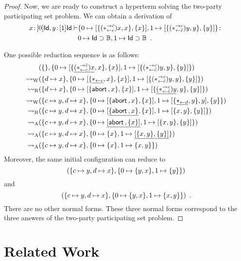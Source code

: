 \begin{proof}
Now, we are ready to construct a hyperterm solving the two-party
participating set problem.
We can obtain a derivation of
 \begin{align*}
{x} \mathord{\colon\kern -2pt}{[0]\mathsf{Id}}, {y} \mathord{\colon\kern -2pt}{[1]\mathsf{Id}}\vdash &
{\{0\mapsto[{\{(\ast^{\rightarrow {\bar{c}}}_{\leftarrow{c}})x,x\},\{x\}}],
1\mapsto[{\{(\ast^{\rightarrow {c}}_{\leftarrow{\bar{c}}})y,y\},\{y\}}]\}}\colon\\
&{0\mapsto \mathsf{Id}\supset \mathbb{B}, 1\mapsto \mathsf{Id}\supset \mathbb{B}}\enspace.
 \end{align*}

One possible reduction sequence is as follows:
\begin{align*}
 &
 ({\{\}},{\{0\mapsto[{\{\underline{(\ast^{\rightarrow {\bar{c}}}_{\leftarrow{c}})x},x\},\{x\}}],
 1\mapsto [{\{(\ast^{\rightarrow {c}}_{\leftarrow{\bar{c}}})y,y\},\{y\}}]\}})\\
 \rightsquigarrow_{\mathrm W}
 &({\{d\mapsto x\}},{\{0\mapsto[{\{\underline{\ast_{\leftarrow{c}}},x\},\{x\}}],
 1\mapsto[{\{(\ast^{\rightarrow {c}}_{\leftarrow{\bar{c}}})y,y\},\{y\}}]\}})
 \\
 \rightsquigarrow_{\mathrm R}
 &
 ({\{d\mapsto x\}},{\{0\mapsto [{\{\mathsf{abort\,},x\},
 \{x\}}],1\mapsto[{\{\underline{(\ast^{\rightarrow {c}}_{\leftarrow{\bar{c}}})y},y\},\{y\}}]\}})
 \\
 \rightsquigarrow_{\mathrm W}
 &
 ({\{c\mapsto y, d\mapsto x\}},{\{0\mapsto [{\{\mathsf{abort\,},x\},\{x\}}], 1\mapsto
 [{\{\underline{\ast_{\leftarrow{d}}},y\},y}],\{y\}\}}) \\
 \rightsquigarrow_{\mathrm R}
 &
 ({\{c\mapsto y, d\mapsto x\}},{\{0\mapsto [{\underline{\{\mathsf{abort\,}, x\}},\{x\}}],
 1\mapsto[{\{x,y\},\{y\}}]\}})
 \\
 \rightsquigarrow_{\mathrm A}
 &
 ({\{c\mapsto y,d\mapsto
 x\}},{\{0\mapsto\underline{[{\mathsf{abort\,},\{x\}}]}, 1\mapsto[{\{x,y\},\{y\}}]\}})
 \\
 \rightsquigarrow_{\mathrm A}
 &
 ({\{c\mapsto y,d\mapsto
 x\}},{\{0\mapsto\{x\}, 1\mapsto\underline{[{\{x,y\},\{y\}}]}\}})
 \\
 \rightsquigarrow_{\mathrm A}
 &
 ({\{c\mapsto y,d\mapsto
 x\}},{\{0\mapsto\{x\}, 1\mapsto\{x,y\}\}})
\end{align*}
Moreover, the same initial configuration can reduce to
\[
({\{c\mapsto y,d\mapsto
 x\}},{\{0\mapsto\{y,x\}, 1\mapsto\{y\}\}})\] and
\[
({\{c\mapsto y,d\mapsto
 x\}},{\{0\mapsto\{y,x\}, 1\mapsto\{x,y\}\}})\enspace.
\]
There are no other normal forms.
These three normal forms correspond to the three answers of the
two-party participating set problem.
\end{proof}

\section{Related Work}
\label{related}

